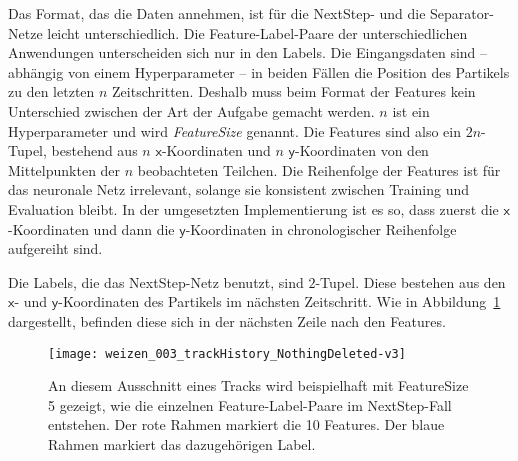 Das Format, das die Daten annehmen, ist für die NextStep- und die Separator-Netze leicht unterschiedlich.
Die Feature-Label-Paare der unterschiedlichen Anwendungen unterscheiden sich nur in den Labels.
Die Eingangsdaten sind -- abhängig von einem Hyperparameter --
in beiden Fällen die Position des Partikels zu den letzten \(n\) Zeitschritten.
Deshalb muss beim Format der Features kein Unterschied zwischen der Art der Aufgabe gemacht werden.
\(n\) ist ein Hyperparameter und wird \textit{FeatureSize} genannt. 
Die Features sind also ein \(2n\)-Tupel, bestehend aus \(n\) \(\mathsf{x}\)-Koordinaten und \(n\) \(\mathsf{y}\)-Koordinaten 
von den Mittelpunkten der \(n\) beobachteten Teilchen.
Die Reihenfolge der Features ist für das neuronale Netz irrelevant, solange sie konsistent zwischen Training und Evaluation bleibt.
In der umgesetzten Implementierung ist es so, dass zuerst die \(\mathsf{x}\)-Koordinaten 
und dann die \(\mathsf{y}\)-Koordinaten in chronologischer Reihenfolge aufgereiht sind. 



Die Labels, die das NextStep-Netz benutzt, sind \(2\)-Tupel.
Diese bestehen aus den \(\mathsf{x}\)- und \(\mathsf{y}\)-Koordinaten des Partikels im nächsten Zeitschritt.
Wie in Abbildung~\ref{fig:FLPNext} dargestellt, befinden diese sich in der nächsten Zeile nach den Features.

\begin{figure}
	\centering
	\texttt{[image: weizen\_003\_trackHistory\_NothingDeleted-v3]}
	\caption[Beispiel Feature-Label-Paar NextStep]{An diesem Ausschnitt eines Tracks wird beispielhaft mit FeatureSize 5 gezeigt, wie die einzelnen Feature-Label-Paare im NextStep-Fall entstehen.
		Der rote Rahmen markiert die 10 Features. Der blaue Rahmen markiert das dazugehörigen Label. 
		}
	\label{fig:FLPNext}
\end{figure}


